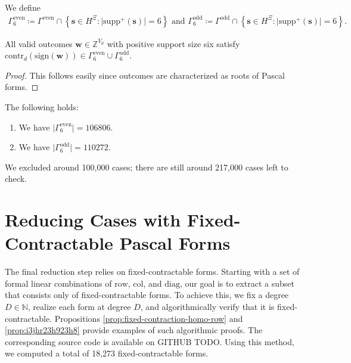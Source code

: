\begin{definition}
    We define 
    \begin{gather*}
        \Gamma^{\mathrm{even}}_6 \coloneqq \Gamma^{\mathrm{even}} \cap \left\{ \mathbf{s} \in H^{\Xi} : \lvert \mathrm{supp}^+(\mathbf{s}) \rvert = 6 \right\}
        \text{ and }
        \Gamma^{\mathrm{odd}}_6 \coloneqq \Gamma^{\mathrm{odd}} \cap \left\{ \mathbf{s} \in H^{\Xi} : \lvert \mathrm{supp}^+(\mathbf{s}) \rvert = 6 \right\}.
    \end{gather*}
\end{definition}

\begin{proposition}
    All valid outcomes \( \mathbf{w} \in \mathbb{Z}^{V_d} \) with positive support size six satisfy \( \mathrm{contr}_d(\mathrm{sign}(\mathbf{w})) \in \Gamma^{\mathrm{even}}_6 \cup \Gamma^{\mathrm{odd}}_6 \).
\end{proposition}

\begin{proof}
    This follows easily since outcomes are characterized as roots of Pascal forms.
\end{proof}

\begin{proposition}
    The following holds:
    \begin{enumerate}
        \item We have \( \lvert \Gamma^{\mathrm{even}}_6 \rvert  = 106806\).
        \item We have \( \lvert \Gamma^{\mathrm{odd}}_6 \rvert  = 110272\).
    \end{enumerate}
\end{proposition}

We excluded around 100,000 cases; there are still around 217,000 cases left to check.

\section{Reducing Cases with Fixed-Contractable Pascal Forms}

The final reduction step relies on fixed-contractable forms. Starting with a set of formal linear combinations of \( \mathrm{row} \), \( \mathrm{col} \), and \( \mathrm{diag} \), our goal is to extract a subset that consists only of fixed-contractable forms. To achieve this, we fix a degree \( D \in \mathbb{N} \), realize each form at degree \( D \), and algorithmically verify that it is fixed-contractable. Propositions \ref{prop:fixed-contraction-homo-row} and \ref{prop:i3jhr23h923h8} provide examples of such algorithmic proofs. The corresponding source code is available on GITHUB TODO. Using this method, we computed a total of 18,273 fixed-contractable forms.

